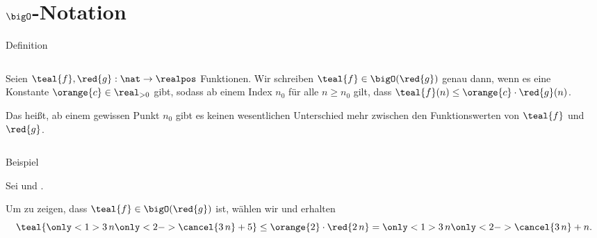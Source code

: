 \section{\uppercase{$\bigO$}-Notation}

\begin{frame}{Definition}
\begin{columns}[T,onlytextwidth]
\begin{column}{0.47\textwidth}
    \begin{definition}
    Seien $\teal{f}, \red{g}: \nat \to \realpos$ Funktionen.
    Wir schreiben $\teal{f} \in \bigO(\red{g})$ genau dann, wenn es eine Konstante $\orange{c} \in \real_{> 0}$ gibt, sodass ab einem Index $n_0$ f\"ur alle $n \geq n_0$ gilt, dass $\teal{f}(n) \leq \orange{c} \cdot \red{g}(n)$.
    \end{definition}
    
    \medskip
    
    {\footnotesize Das hei{\ss}t, ab einem gewissen Punkt $n_0$ gibt es keinen \alert{wesentlichen} Unterschied mehr zwischen den Funktionswerten von $\teal{f}$ und $\red{g}$.}
\end{column}
\begin{column}{0.47\textwidth}
\end{column}
\end{columns}
\end{frame}

\begin{frame}{Beispiel}
\begin{example}
Sei  und .

Um zu zeigen, dass $\teal{f} \in \bigO(\red{g})$ ist, w\"ahlen wir  und erhalten
\begin{equation*}
    \teal{\only<1>{3 \, n} \only<2->{\cancel{3 \, n}} + 5} \leq \orange{2} \cdot \red{2 \, n} = \only<1>{3 \, n} \only<2->{\cancel{3 \, n}} + n.
\end{equation*}
\end{example}
\end{frame}

